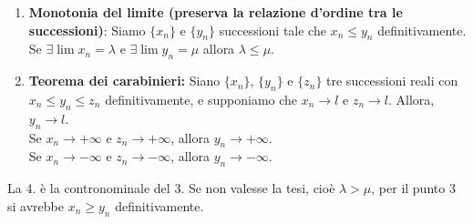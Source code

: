 \documentclass[a4paper]{article}
\begin{document}
{\begin{enumerate}
        \(x_n \in (-\infty, a)\) cioè \(x_n < a\) e \(y\in (b,+\infty)\), cioè \(y_n > b\).
        Nota: perché valga la tesi, deve esserci la disuguaglianza stretta.
        Con \[x_n = \frac{{(-1)}^n}{n} \to 0\]
        Infatti, \(x_n \to 0\) se e solo se \(|x_n| \to 0\)
        \[
            \begin{cases}
                x_n \to 0 & \forall \varepsilon > 0, \exists N \,|\, \forall n \geq N, |x_n - 0| < \varepsilon \\
                |x_n| \to 0 & \forall \varepsilon > 0, \exists N \,|\, \forall n \geq N, ||x_n| - 0| < \varepsilon
            \end{cases}
        \]
        Poichè
        \[
            \left|{(-1)}^n \frac{1}{n}\right| = \frac{1}{n} \to 0
        \]
        poniamo \(y_0 = 0, \forall n\) non vale nè \(x_n \geq 0\) nè \(x_n \leq 0\) definitivamente.

        In particolare, se \(y_n \to \mu > 0\), \(y_n\) è definitivamente strettamente \(> 0\)
        cioè esiste \(N\) tale che \(\forall n \geq N, y_n > 0\) e infatti
        \(\forall b \in (0, \mu)\) esiste \(N\) tale che \(y_n > b, \forall n \geq N\).
        \item \textbf{Monotonia del limite (preserva la relazione d'ordine tra le successioni)}:
        Siamo \(\{x_n\}\) e \(\{y_n\}\) successioni tale che \(x_n \leq y_n\) definitivamente.
        Se \(\exists \lim x_n = \lambda\) e \(\exists \lim y_n = \mu\) allora \(\lambda \leq \mu\).
        \item \textbf{Teorema dei carabinieri:} Siano \(\{x_n\}\), \(\{y_n\}\) e \(\{z_n\}\)
        tre successioni reali con \(x_n \leq y_n \leq z_n\) definitivamente, e supponiamo
        che \(x_n \to l\) e \(z_n \to l\).
        Allora, \(y_n \to l\). \\
        Se \(x_n \to +\infty\) e \(z_n \to +\infty\), allora \(y_n \to +\infty\). \\
        Se \(x_n \to -\infty\) e \(z_n \to -\infty\), allora \(y_n \to -\infty\).
    \end{enumerate}
}

La 4. è la contronominale del 3.
Se non valesse la tesi, cioè \(\lambda > \mu\), per il punto \(3\) si avrebbe
\(x_n \geq y_n\) definitivamente.

\end{document}
